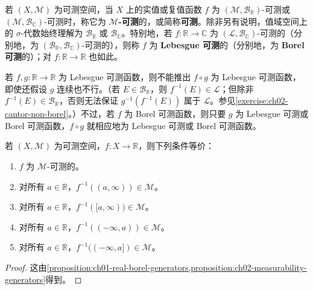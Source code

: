 \documentclass[../../main.tex]{subfiles}%
\begin{document}
\begin{definition}[实值与复值可测函数]\label{definition:ch02-scalar-measurable}
若 $(X,\mathscr{M})$ 为可测空间，当 $X$ 上的实值或复值函数 $f$ 为 $(\mathscr{M},\mathscr{B}_{\mathbb{R}})$-可测或 $(\mathscr{M},\mathscr{B}_{\mathbb{C}})$-可测时，称它为 \textbf{$\mathscr{M}$-可测}的，或简称\textbf{可测}。除非另有说明，值域空间上的 $\sigma$-代数始终理解为 $\mathscr{B}_{\mathbb{R}}$ 或 $\mathscr{B}_{\mathbb{C}}$。特别地，若 $f:\mathbb{R}\to\mathbb{C}$ 为 $(\mathscr{L},\mathscr{B}_{\mathbb{C}})$-可测的（分别地，为 $(\mathscr{B}_{\mathbb{R}},\mathscr{B}_{\mathbb{C}})$-可测的），则称 $f$ 为 \textbf{Lebesgue 可测}的（分别地，为 \textbf{Borel 可测}的）；对 $f:\mathbb{R}\to\mathbb{R}$ 也如此。
\end{definition}

\begin{remark}
若 $f,g:\mathbb{R}\to\mathbb{R}$ 为 Lebesgue 可测函数，则不能推出 $f\circ g$ 为 Lebesgue 可测函数，即使还假设 $g$ 连续也不行。（若 $E\in\mathscr{B}_{\mathbb{R}}$，则 $f^{-1}(E)\in\mathscr{L}$；但除非 $f^{-1}(E)\in\mathscr{B}_{\mathbb{R}}$，否则无法保证 $g^{-1}(f^{-1}(E))$ 属于 $\mathscr{L}$。参见\cref{exercise:ch02-cantor-non-borel}。）不过，若 $f$ 为 Borel 可测函数，则只要 $g$ 为 Lebesgue 可测或 Borel 可测函数，$f\circ g$ 就相应地为 Lebesgue 可测或 Borel 可测函数。
\end{remark}

\begin{proposition}\label{proposition:ch02-real-measurability-rays}
若 $(X,\mathscr{M})$ 为可测空间，$f:X\to\mathbb{R}$，则下列条件等价：
\begin{enumerate}[label=\alph*.,ref=(\alph*)]
\item\label{item:ch02-rays-measurable} $f$ 为 $\mathscr{M}$-可测的。
\item\label{item:ch02-rays-open-upper} 对所有 $a\in\mathbb{R}$，$f^{-1}((a,\infty))\in\mathscr{M}$。
\item\label{item:ch02-rays-closed-upper} 对所有 $a\in\mathbb{R}$，$f^{-1}([a,\infty))\in\mathscr{M}$。
\item\label{item:ch02-rays-open-lower} 对所有 $a\in\mathbb{R}$，$f^{-1}((-\infty,a))\in\mathscr{M}$。
\item\label{item:ch02-rays-closed-lower} 对所有 $a\in\mathbb{R}$，$f^{-1}((-\infty,a])\in\mathscr{M}$。
\end{enumerate}
\end{proposition}
\begin{proof}
这由\cref{proposition:ch01-real-borel-generators,proposition:ch02-measurability-generators}得到。
\end{proof}
\end{document}
